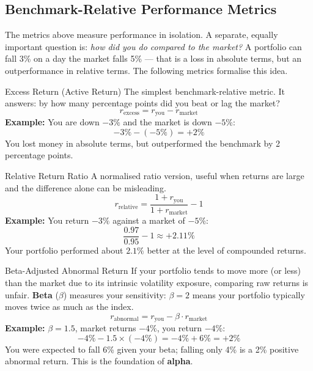 \subsection{Benchmark-Relative Performance Metrics}

The metrics above measure performance in isolation. A separate, equally important
question is: \emph{how did you do compared to the market?}
A portfolio can fall 3\% on a day the market falls 5\% — that is a loss in absolute
terms, but an outperformance in relative terms. The following metrics formalise this idea.

\begin{keyterm}{Excess Return (Active Return)}
The simplest benchmark-relative metric. It answers: by how many percentage points did
you beat or lag the market?
\[
  r_{\text{excess}} = r_{\text{you}} - r_{\text{market}}
\]
\textbf{Example:} You are down $-3\%$ and the market is down $-5\%$:
\[
  -3\% - (-5\%) = +2\%
\]
You lost money in absolute terms, but outperformed the benchmark by 2 percentage points.
\end{keyterm}

\begin{keyterm}{Relative Return Ratio}
A normalised ratio version, useful when returns are large and the difference alone
can be misleading.
\[
  r_{\text{relative}} = \frac{1 + r_{\text{you}}}{1 + r_{\text{market}}} - 1
\]
\textbf{Example:} You return $-3\%$ against a market of $-5\%$:
\[
  \frac{0.97}{0.95} - 1 \approx +2.11\%
\]
Your portfolio performed about $2.1\%$ better at the level of compounded returns.
\end{keyterm}

\begin{keyterm}{Beta-Adjusted Abnormal Return}
If your portfolio tends to move more (or less) than the market due to its intrinsic
volatility exposure, comparing raw returns is unfair. \textbf{Beta} ($\beta$) measures
your sensitivity: $\beta = 2$ means your portfolio typically moves twice as much as
the index.
\[
  r_{\text{abnormal}} = r_{\text{you}} - \beta \cdot r_{\text{market}}
\]
\textbf{Example:} $\beta = 1.5$, market returns $-4\%$, you return $-4\%$:
\[
  -4\% - 1.5 \times (-4\%) = -4\% + 6\% = +2\%
\]
You were expected to fall 6\% given your beta; falling only 4\% is a 2\% positive
abnormal return. This is the foundation of \textbf{alpha}.
\end{keyterm}

